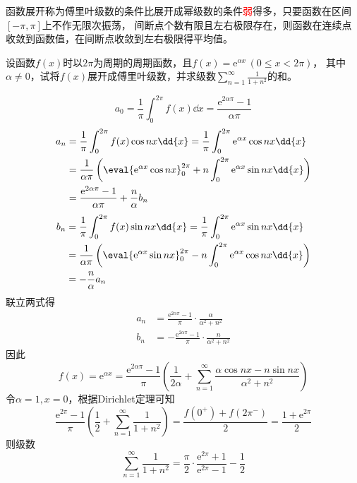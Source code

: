 函数展开称为傅里叶级数的条件比展开成幂级数的条件\textcolor{red}{弱}得多，只要函数在区间$[-\pi,\pi]$上不作无限次振荡，
间断点个数有限且左右极限存在，则函数在连续点收敛到函数值，在间断点收敛到左右极限得平均值。

\begin{example}
    设函数$f(x)$时以$2\pi$为周期的周期函数，且$f(x)=\mathrm{e}^{\alpha x}\,(0\leq x<2\pi)$，
    其中$\alpha\neq 0$，试将$f(x)$展开成傅里叶级数，并求级数$\displaystyle\sum_{n=1}^\infty\frac{1}{1+n^2}$的和。
\end{example}
\begin{solution}
    \[ a_0 = \frac{1}{\pi}\int_0^{2\pi} f(x)\dd{x} = \frac{\mathrm{e}^{2\alpha\pi} - 1}{\alpha\pi}\]
    \begin{align*}
        a_n & = \frac{1}{\pi}\int_0^{2\pi} f(x)\cos nx\dd{x} = \frac{1}{\pi}\int_0^{2\pi} \mathrm{e}^{\alpha x}\cos nx\dd{x}                      \\
            & =\frac{1}{\alpha\pi} \left(\eval{\mathrm{e}^{\alpha x}\cos nx}_0^{2\pi} + n\int_0^{2\pi} \mathrm{e}^{\alpha x}\sin nx\dd{x} \right) \\
            & =\frac{\mathrm{e}^{2\alpha\pi} - 1}{\alpha\pi} +  \frac{n}{\alpha}b_n
    \end{align*}
    \begin{align*}
        b_n & = \frac{1}{\pi}\int_0^{2\pi} f(x)\sin nx\dd{x} = \frac{1}{\pi}\int_0^{2\pi} \mathrm{e}^{\alpha x}\sin nx\dd{x}                      \\
            & =\frac{1}{\alpha\pi} \left(\eval{\mathrm{e}^{\alpha x}\sin nx}_0^{2\pi} - n\int_0^{2\pi} \mathrm{e}^{\alpha x}\cos nx\dd{x} \right) \\
            & =-\frac{n}{\alpha}a_n
    \end{align*}
    联立两式得
    \begin{align*}
        a_n & = \frac{\mathrm{e}^{2\alpha\pi}-1}{\pi} \cdot \frac{\alpha}{\alpha^2+n^2} \\
        b_n & = -\frac{\mathrm{e}^{2\alpha\pi}-1}{\pi} \cdot \frac{n}{\alpha^2+n^2}
    \end{align*}
    因此
    \[
        f(x) = \mathrm{e}^{\alpha x}
        = \frac{\mathrm{e}^{2\alpha\pi} - 1}{\pi}
        \left(\frac{1}{2\alpha} + \sum_{n=1}^\infty \frac{\alpha\cos nx - n\sin nx}{\alpha^2+n^2}\right)
    \]
    令$\alpha=1,x=0$，根据Dirichlet定理可知
    \[
        \frac{\mathrm{e}^{2\pi} - 1}{\pi}\left(\frac{1}{2}+ \sum_{n=1}^\infty \frac{1}{1+n^2}\right)
        =
        \frac{f(0^+)+f(2\pi^-)}{2}
        =
        \frac{1+\mathrm{e}^{2\pi}}{2}
    \]
    则级数
    \[ \sum_{n=1}^\infty \frac{1}{1+n^2} = \frac{\pi}{2}\cdot\frac{\mathrm{e}^{2\pi}+1}{\mathrm{e}^{2\pi}-1} - \frac{1}{2} \]
\end{solution}


